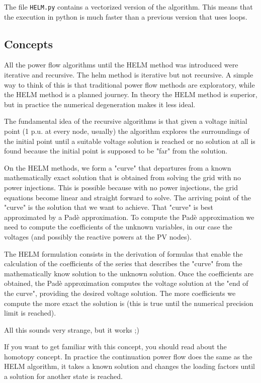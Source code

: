 \documentclass[11pt,fleqn]{book} %
\begin{document}
The file \verb|HELM.py| contains a vectorized version of the algorithm. This means that the execution in python is much faster than a previous version that uses loops.

\subsection{Concepts}

All the power flow algorithms until the HELM method was introduced were iterative and recursive. The helm method is iterative but not recursive. A simple way to think of this is that traditional power flow methods are exploratory, while the HELM method is a planned journey. In theory the HELM method is superior, but in practice the numerical degeneration makes it less ideal.

The fundamental idea of the recursive algorithms is that given a voltage initial point (1 p.u. at every node, usually) the algorithm explores the surroundings of the initial point until a suitable voltage solution is reached or no solution at all is found because the initial point is supposed to be "far" from the solution.

On the HELM methods, we form a "curve" that departures from a known mathematically exact solution that is obtained from solving the grid with no power injections. This is possible because with no power injections, the grid equations become linear and straight forward to solve. The arriving point of the "curve" is the solution that we want to achieve. That "curve" is best approximated by a Padè approximation. To compute the Padè approximation we need to compute the coefficients of the unknown variables, in our case the voltages (and possibly the reactive powers at the PV nodes).

The HELM formulation consists in the derivation of formulas that enable the calculation of the coefficients of the series that describes the "curve" from the mathematically know solution to the unknown solution. Once the coefficients are obtained, the Padè approximation computes the voltage solution at the "end of the curve", providing the desired voltage solution. The more coefficients we compute the more exact the solution is (this is true until the numerical precision limit is reached).\newline 


All this sounds very strange, but it works ;)\newline 


If you want to get familiar with this concept, you should read about the homotopy concept. In practice the continuation power flow does the same as the HELM algorithm, it takes a known solution and changes the loading factors until a solution for another state is reached.
\end{document}
